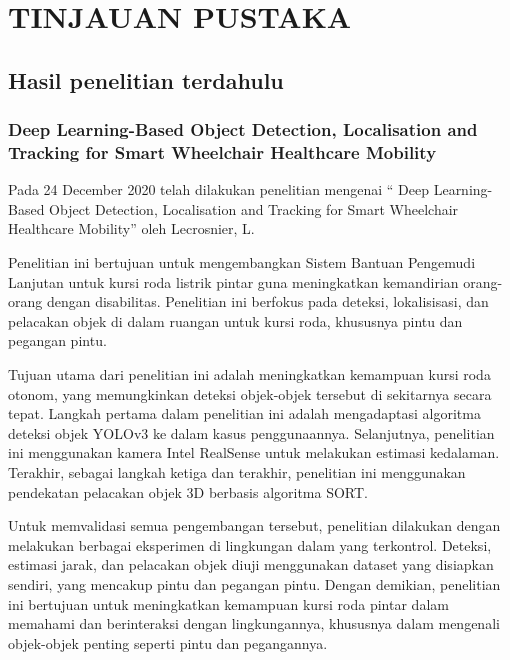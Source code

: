 \chapter{TINJAUAN PUSTAKA}
\label{chap:tinjauanpustaka}

\section{Hasil penelitian terdahulu}
\label{sec:roketluarangkasa}

\subsection{Deep Learning-Based Object Detection, Localisation and Tracking for Smart Wheelchair Healthcare Mobility}
\label{subsec:hukumnewton}

Pada 24 December 2020 telah dilakukan penelitian mengenai “	Deep Learning-Based Object Detection, Localisation and Tracking for Smart Wheelchair Healthcare Mobility” oleh Lecrosnier, L. \parencite{lecrosnier2021deep}

Penelitian ini bertujuan untuk mengembangkan Sistem Bantuan Pengemudi Lanjutan untuk kursi roda listrik pintar guna meningkatkan kemandirian orang-orang dengan disabilitas. Penelitian ini berfokus pada deteksi, lokalisisasi, dan pelacakan objek di dalam ruangan untuk kursi roda, khususnya pintu dan pegangan pintu.

Tujuan utama dari penelitian ini adalah meningkatkan kemampuan kursi roda otonom, yang memungkinkan deteksi objek-objek tersebut di sekitarnya secara tepat. Langkah pertama dalam penelitian ini adalah mengadaptasi algoritma deteksi objek YOLOv3 ke dalam kasus penggunaannya. Selanjutnya, penelitian ini menggunakan kamera Intel RealSense untuk melakukan estimasi kedalaman. Terakhir, sebagai langkah ketiga dan terakhir, penelitian ini menggunakan pendekatan pelacakan objek 3D berbasis algoritma SORT.

Untuk memvalidasi semua pengembangan tersebut, penelitian dilakukan dengan melakukan berbagai eksperimen di lingkungan dalam yang terkontrol. Deteksi, estimasi jarak, dan pelacakan objek diuji menggunakan dataset yang disiapkan sendiri, yang mencakup pintu dan pegangan pintu. Dengan demikian, penelitian ini bertujuan untuk meningkatkan kemampuan kursi roda pintar dalam memahami dan berinteraksi dengan lingkungannya, khususnya dalam mengenali objek-objek penting seperti pintu dan pegangannya. \parencite{lecrosnier2021deep}

